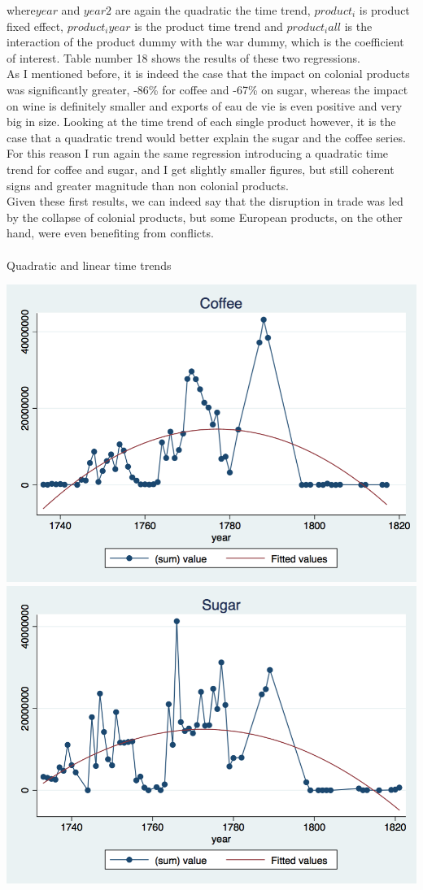 \documentclass[12pt,a4paper,titlepage]{article}
\begin{document}
where$year$ and $year2$ are again the quadratic the time trend, $product_i$ is product fixed effect, $product_iyear$ is the product time trend and $product_iall$ is the interaction of the product dummy with the war dummy, which is the coefficient of interest. Table number 18 shows the results of these two regressions. \\
As I mentioned before, it is indeed the case that the impact on colonial products was significantly greater, -86\% for coffee and -67\% on sugar, whereas the impact on wine is definitely smaller and exports of eau de vie is even positive and very big in size. Looking at the time trend of each single product however, it is the case that a quadratic trend would better explain the sugar and the coffee series. For this reason I run again the same regression introducing a quadratic time trend for coffee and sugar, and I get slightly smaller figures, but still coherent signs and greater magnitude than non colonial products. \\
Given these first results, we can indeed say that the disruption in trade was led by the collapse of colonial products, but some European products, on the other hand, were even benefiting from conflicts.\\~\\
\caption{Quadratic and linear time trends}
\includegraphics[scale=.28]{coffee_qfit.png}
\includegraphics[scale=.28]{sugar_qfit.png}
\end{document}
